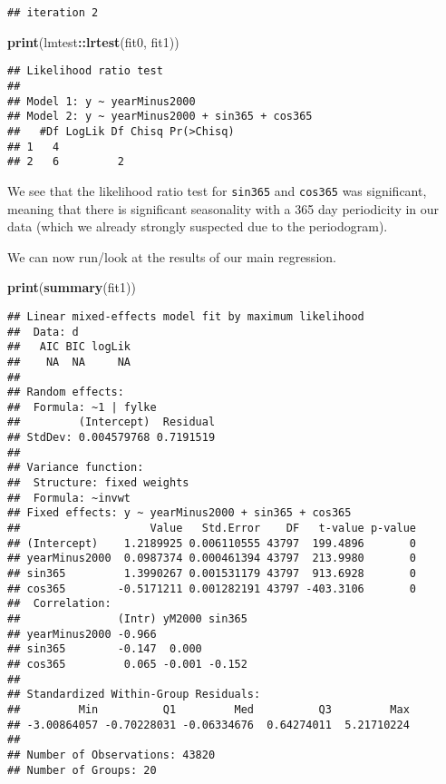 \documentclass[]{book}
\newenvironment{Shaded}{\begin{snugshade}}{\end{snugshade}}
\newcommand{\KeywordTok}[1]{\textcolor[rgb]{0.13,0.29,0.53}{\textbf{#1}}}
\newcommand{\OperatorTok}[1]{\textcolor[rgb]{0.81,0.36,0.00}{\textbf{#1}}}
\newcommand{\NormalTok}[1]{#1}
\begin{document}
\begin{verbatim}
## iteration 2
\end{verbatim}

\begin{Shaded}
\begin{Highlighting}[]
\KeywordTok{print}\NormalTok{(lmtest}\OperatorTok{::}\KeywordTok{lrtest}\NormalTok{(fit0, fit1))}
\end{Highlighting}
\end{Shaded}

\begin{verbatim}
## Likelihood ratio test
## 
## Model 1: y ~ yearMinus2000
## Model 2: y ~ yearMinus2000 + sin365 + cos365
##   #Df LogLik Df Chisq Pr(>Chisq)
## 1   4                           
## 2   6         2
\end{verbatim}

We see that the likelihood ratio test for \texttt{sin365} and
\texttt{cos365} was significant, meaning that there is significant
seasonality with a 365 day periodicity in our data (which we already
strongly suspected due to the periodogram).

\newpage

We can now run/look at the results of our main regression.

\begin{Shaded}
\begin{Highlighting}[]
\KeywordTok{print}\NormalTok{(}\KeywordTok{summary}\NormalTok{(fit1))}
\end{Highlighting}
\end{Shaded}

\begin{verbatim}
## Linear mixed-effects model fit by maximum likelihood
##  Data: d 
##   AIC BIC logLik
##    NA  NA     NA
## 
## Random effects:
##  Formula: ~1 | fylke
##         (Intercept)  Residual
## StdDev: 0.004579768 0.7191519
## 
## Variance function:
##  Structure: fixed weights
##  Formula: ~invwt 
## Fixed effects: y ~ yearMinus2000 + sin365 + cos365 
##                    Value   Std.Error    DF   t-value p-value
## (Intercept)    1.2189925 0.006110555 43797  199.4896       0
## yearMinus2000  0.0987374 0.000461394 43797  213.9980       0
## sin365         1.3990267 0.001531179 43797  913.6928       0
## cos365        -0.5171211 0.001282191 43797 -403.3106       0
##  Correlation: 
##               (Intr) yM2000 sin365
## yearMinus2000 -0.966              
## sin365        -0.147  0.000       
## cos365         0.065 -0.001 -0.152
## 
## Standardized Within-Group Residuals:
##         Min          Q1         Med          Q3         Max 
## -3.00864057 -0.70228031 -0.06334676  0.64274011  5.21710224 
## 
## Number of Observations: 43820
## Number of Groups: 20
\end{verbatim}
\end{document}
